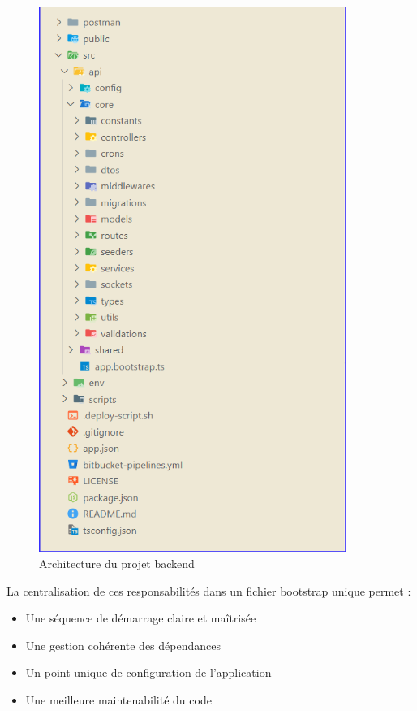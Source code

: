 {\begin{enumerate}
\begin{figure}[H]
\begin{center}
\includegraphics[width=10cm]{assets/presentation/treewh.png}
\end{center}
\caption{Architecture du projet backend}
\end{figure}

\vspace{0.35cm}

La centralisation de ces responsabilités dans un fichier bootstrap unique permet :

\begin{itemize}
    \item Une séquence de démarrage claire et maîtrisée
    \item Une gestion cohérente des dépendances
    \item Un point unique de configuration de l'application
    \item Une meilleure maintenabilité du code
\end{itemize}


\end{enumerate}}
